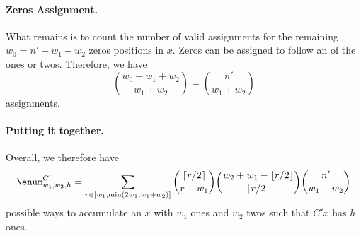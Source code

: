 \paragraph{Zeros Assignment.} What remains is to count the number of valid assignments for the remaining $w_0=n'-w_1-w_2$ zeros positions in $x$. Zeros can be assigned to follow an of the ones or twos. Therefore, we have
$$
{w_0 + w_1+w_2 \choose w_1+w_2} = {n' \choose w_1+w_2} 
$$
assignments.

\paragraph{Putting it together.} Overall, we therefore have 
$$
\enum^{C'}_{w_1,w_2,h} = \sum_{r\in [w_1,\min(2w_1,w_1+w_2)]}   {\lceil r/2\rceil \choose r-w_1} {w_2+w_1-\lfloor r/2\rfloor \choose \lceil r/2\rceil} {n' \choose w_1+w_2} 
$$
possible ways to accumulate an $x$ with $w_1$ ones and $w_2$ twos such that $C'x$ has $h$ ones.

